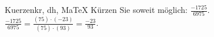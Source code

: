 \begin{MAufgabe}{Kuerzen}{kr, dh, MaTeX}
K\"urzen Sie soweit m\"oglich: $\frac{-1725}{6975}$.\\ 
\ifLsg\MLoesung
\quad $\frac{-1725}{6975}=\frac{(75)\cdot(-23)}{(75)\cdot(93)}=\frac{-23}{93}$.\else\relax\fi
 \end{MAufgabe}